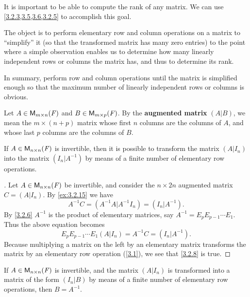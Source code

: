\begin{note}
	It is important to be able to compute the rank of any matrix.
	We can use \cref{3.2.3,3.5,3.6,3.2.5} to accomplish this goal.

	The object is to perform elementary row and column operations on a matrix to ``simplify'' it (so that the transformed matrix has many zero entries) to the point where a simple observation enables us to determine how many linearly independent rows or columns the matrix has, and thus to determine its rank.

	In summary, perform row and column operations until the matrix is simplified enough so that the maximum number of linearly independent rows or columns is obvious.
\end{note}

\begin{defn}\label{3.2.7}
	Let \(A \in \mathsf{M}_{{m} \times n}({\mathit{F}})\) and \(B \in \mathsf{M}_{{m} \times p}({\mathit{F}})\).
	By the \textbf{augmented matrix} \((A | B)\), we mean the \(m \times (n + p)\) matrix whose first \(n\) columns are the columns of \(A\), and whose last \(p\) columns are the columns of \(B\).
\end{defn}

\begin{cor}\label{3.2.8}
	If \(A \in \mathsf{M}_{{n} \times n}({\mathit{F}})\) is invertible, then it is possible to transform the matrix \((A | I_n)\) into the matrix \((I_n | A^{-1})\) by means of a finite number of elementary row operations.
\end{cor}

\begin{proof}[]
	Let \(A \in \mathsf{M}_{{n} \times n}({\mathit{F}})\) be invertible, and consider the \(n \times 2n\) augmented matrix \(C = (A | I_n)\).
	By \cref{ex:3.2.15} we have
	\[
		A^{-1} C = (A^{-1} A | A^{-1} I_n) = (I_n | A^{-1}).
	\]
	By \cref{3.2.6} \(A^{-1}\) is the product of elementary matrices, say \(A^{-1} = E_p E_{p - 1} \cdots E_1\).
	Thus the above equation becomes
	\[
		E_p E_{p - 1} \cdots E_1 (A | I_n) = A^{-1} C = (I_n | A^{-1}).
	\]
	Because multiplying a matrix on the left by an elementary matrix transforms the matrix by an elementary row operation (\cref{3.1}), we see that \cref{3.2.8} is true.
\end{proof}

\begin{cor}\label{3.2.9}
	If \(A \in \mathsf{M}_{{n} \times n}({\mathit{F}})\) is invertible, and the matrix \((A | I_n)\) is transformed into a matrix of the form \((I_n | B)\) by means of a finite number of elementary row operations, then \(B = A^{-1}\).
\end{cor}

